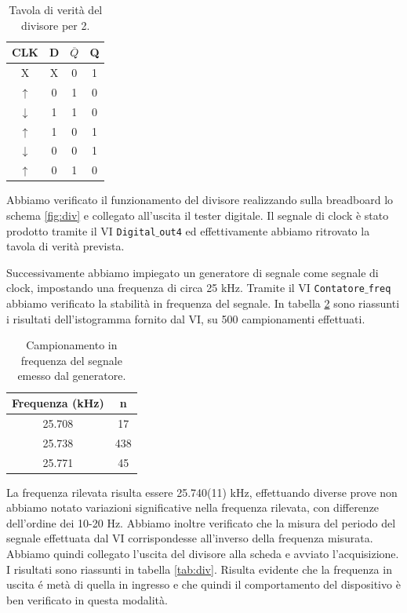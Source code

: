 \documentclass[journal, a4paper]{IEEEtran}
\begin{document}
\begin{table}[htp]
\centering
\caption{Tavola di verità del divisore per 2.}
\label{tab:tabdiv}
\begin{tabular}{|c|c|c|c|}
\hline 
CLK & D & $\overline{Q}$ & Q \\ 
\hline 
X & X & 0 & 1 \\ 
\hline 
$\uparrow$ & 0 & 1 & 0 \\ 
\hline 
$\downarrow$ & 1 & 1 & 0 \\ 
\hline 
$\uparrow$ & 1 & 0 & 1 \\ 
\hline 
$\downarrow$ & 0 & 0 & 1 \\ 
\hline 
$\uparrow$ & 0 & 1 & 0 \\ 
\hline 
\end{tabular} 
\end{table}

Abbiamo verificato il funzionamento del divisore realizzando sulla breadboard lo schema \ref{fig:div} e collegato all'uscita il tester digitale. Il segnale di clock è stato prodotto tramite il VI \texttt{Digital$\_$out4} ed effettivamente abbiamo ritrovato la tavola di verità prevista.

Successivamente abbiamo impiegato un generatore di segnale come segnale di clock, impostando una frequenza di circa 25 kHz. Tramite il VI \texttt{Contatore$\_$freq} abbiamo verificato la stabilità in frequenza del segnale. In tabella \ref{tab:freq} sono riassunti i risultati dell'istogramma fornito dal VI, su 500 campionamenti effettuati.

\begin{table}[htp]
\centering
\caption{Campionamento in frequenza del segnale emesso dal generatore.}
\label{tab:freq}
\begin{tabular}{|c|c|}
\hline 
Frequenza (kHz) & n \\ 
\hline 
25.708 & 17 \\ 
\hline 
25.738 & 438 \\ 
\hline 
25.771 & 45 \\ 
\hline 
\end{tabular}
\end{table} 

La frequenza rilevata risulta essere 25.740(11) kHz, effettuando diverse prove non abbiamo notato variazioni significative nella frequenza rilevata, con differenze dell'ordine dei 10-20 Hz. Abbiamo inoltre verificato che la misura del periodo del segnale effettuata dal VI corrispondesse all'inverso della frequenza misurata.\\
Abbiamo quindi collegato l'uscita del divisore alla scheda e avviato l'acquisizione. I risultati sono riassunti in tabella \ref{tab:div}. Risulta evidente che la frequenza in uscita é metà di quella in ingresso e che quindi il comportamento del dispositivo è ben verificato in questa modalità.
\end{document}

